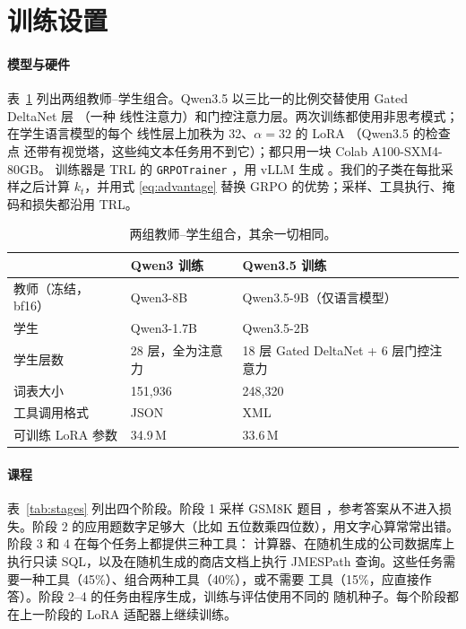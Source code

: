 \documentclass[11pt,a4paper,fontset=none]{ctexart}
\begin{document}
\section{训练设置}
\label{sec:setup}

\paragraph{模型与硬件}
表~\ref{tab:models} 列出两组教师–学生组合。Qwen3.5 \citep{qwen2026qwen35}
以三比一的比例交替使用 Gated DeltaNet 层 \citep{yang2025gateddeltanet}（一种
线性注意力）和门控注意力层。两次训练都使用非思考模式；在学生语言模型的每个
线性层上加秩为 32、$\alpha=32$ 的 LoRA \citep{hu2022lora}（Qwen3.5 的检查点
还带有视觉塔，这些纯文本任务用不到它）；都只用一块 Colab A100-SXM4-80GB。
训练器是 TRL 的 \texttt{GRPOTrainer} \citep{vonwerra2020trl}，用 vLLM 生成
\citep{kwon2023vllm}。我们的子类在每批采样之后计算 $k_t$，并用式
\eqref{eq:advantage} 替换 GRPO 的优势；采样、工具执行、掩码和损失都沿用 TRL。

\begin{table}[t]
\centering\small
\caption{两组教师–学生组合，其余一切相同。}
\label{tab:models}
\begin{tabular}{@{}lll@{}}
\toprule
\headrow & Qwen3 训练 & Qwen3.5 训练 \\
\midrule
教师（冻结，bf16） & Qwen3-8B & Qwen3.5-9B（仅语言模型） \\
学生 & Qwen3-1.7B & Qwen3.5-2B \\
学生层数 & 28 层，全为注意力 & 18 层 Gated DeltaNet + 6 层门控注意力 \\
词表大小 & 151{,}936 & 248{,}320 \\
工具调用格式 & JSON & XML \\
可训练 LoRA 参数 & 34.9\,M & 33.6\,M \\
\bottomrule
\end{tabular}
\end{table}

\paragraph{课程}
表~\ref{tab:stages} 列出四个阶段。阶段 1 采样 GSM8K 题目
\citep{cobbe2021gsm8k}，参考答案从不进入损失。阶段 2 的应用题数字足够大（比如
五位数乘四位数），用文字心算常常出错。阶段 3 和 4 在每个任务上都提供三种工具：
计算器、在随机生成的公司数据库上执行只读 SQL，以及在随机生成的商店文档上执行
JMESPath 查询。这些任务需要一种工具（45\%）、组合两种工具（40\%），或不需要
工具（15\%，应直接作答）。阶段 2--4 的任务由程序生成，训练与评估使用不同的
随机种子。每个阶段都在上一阶段的 LoRA 适配器上继续训练。
\end{document}

